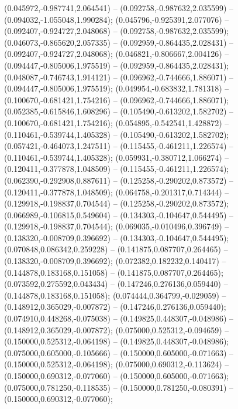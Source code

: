  (0.045972,-0.987741,2.064541) -- (0.092758,-0.987632,2.035599) -- (0.094032,-1.055048,1.990284);
 (0.045796,-0.925391,2.077076) -- (0.092407,-0.924727,2.048068) -- (0.092758,-0.987632,2.035599);
 (0.046073,-0.865620,2.057335) -- (0.092959,-0.864435,2.028431) -- (0.092407,-0.924727,2.048068);
 (0.046821,-0.806667,2.004126) -- (0.094447,-0.805006,1.975519) -- (0.092959,-0.864435,2.028431);
 (0.048087,-0.746743,1.914121) -- (0.096962,-0.744666,1.886071) -- (0.094447,-0.805006,1.975519);
 (0.049954,-0.683832,1.781318) -- (0.100670,-0.681421,1.754216) -- (0.096962,-0.744666,1.886071);
 (0.052385,-0.615846,1.608296) -- (0.105490,-0.613202,1.582702) -- (0.100670,-0.681421,1.754216);
 (0.054895,-0.542541,1.428872) -- (0.110461,-0.539744,1.405328) -- (0.105490,-0.613202,1.582702);
 (0.057421,-0.464073,1.247511) -- (0.115455,-0.461211,1.226574) -- (0.110461,-0.539744,1.405328);
 (0.059931,-0.380712,1.066274) -- (0.120411,-0.377878,1.048509) -- (0.115455,-0.461211,1.226574);
 (0.062390,-0.292908,0.887611) -- (0.125258,-0.290202,0.873572) -- (0.120411,-0.377878,1.048509);
 (0.064758,-0.201317,0.714344) -- (0.129918,-0.198837,0.704544) -- (0.125258,-0.290202,0.873572);
 (0.066989,-0.106815,0.549604) -- (0.134303,-0.104647,0.544495) -- (0.129918,-0.198837,0.704544);
 (0.069035,-0.010496,0.396749) -- (0.138320,-0.008709,0.396692) -- (0.134303,-0.104647,0.544495);
 (0.070848,0.086342,0.259228) -- (0.141875,0.087707,0.264465) -- (0.138320,-0.008709,0.396692);
 (0.072382,0.182232,0.140417) -- (0.144878,0.183168,0.151058) -- (0.141875,0.087707,0.264465);
 (0.073592,0.275592,0.043434) -- (0.147246,0.276136,0.059440) -- (0.144878,0.183168,0.151058);
 (0.074444,0.364799,-0.029059) -- (0.148912,0.365029,-0.007872) -- (0.147246,0.276136,0.059440);
 (0.074910,0.448268,-0.075038) -- (0.149825,0.448307,-0.048986) -- (0.148912,0.365029,-0.007872);
 (0.075000,0.525312,-0.094659) -- (0.150000,0.525312,-0.064198) -- (0.149825,0.448307,-0.048986);
 (0.075000,0.605000,-0.105666) -- (0.150000,0.605000,-0.071663) -- (0.150000,0.525312,-0.064198);
 (0.075000,0.690312,-0.113624) -- (0.150000,0.690312,-0.077060) -- (0.150000,0.605000,-0.071663);
 (0.075000,0.781250,-0.118535) -- (0.150000,0.781250,-0.080391) -- (0.150000,0.690312,-0.077060);
